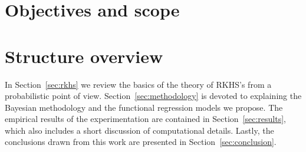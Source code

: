 \section{Objectives and scope}

\section{Structure overview}

In Section~\ref{sec:rkhs} we review the basics of the theory of RKHS's from a probabilistic point of view. Section~\ref{sec:methodology} is devoted to explaining the Bayesian methodology and the functional regression models we propose. The empirical results of the experimentation are contained in Section~\ref{sec:results}, which also includes a short discussion of computational details. Lastly, the conclusions drawn from this work are presented in Section~\ref{sec:conclusion}.
